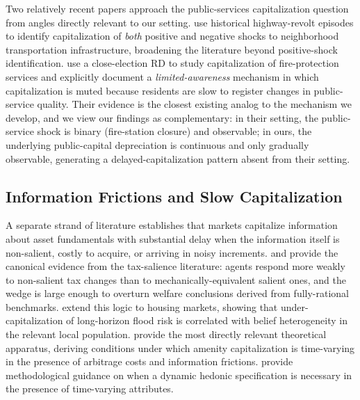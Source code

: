 Two relatively recent papers approach the public-services capitalization question from angles directly relevant to our setting. \citet{brinkman2024freeway} use historical highway-revolt episodes to identify capitalization of {\it both} positive and negative shocks to neighborhood transportation infrastructure, broadening the literature beyond positive-shock identification. \citet{brasington2024fire} use a close-election RD to study capitalization of fire-protection services and explicitly document a {\it limited-awareness} mechanism in which capitalization is muted because residents are slow to register changes in public-service quality. Their evidence is the closest existing analog to the mechanism we develop, and we view our findings as complementary: in their setting, the public-service shock is binary (fire-station closure) and observable; in ours, the underlying public-capital depreciation is continuous and only gradually observable, generating a delayed-capitalization pattern absent from their setting.

\subsection*{Information Frictions and Slow Capitalization}

A separate strand of literature establishes that markets capitalize information about asset fundamentals with substantial delay when the information itself is non-salient, costly to acquire, or arriving in noisy increments. \citet{chetty2009salience} and \citet{finkelstein2009eztax} provide the canonical evidence from the tax-salience literature: agents respond more weakly to non-salient tax changes than to mechanically-equivalent salient ones, and the wedge is large enough to overturn welfare conclusions derived from fully-rational benchmarks. \citet{bakkensen2022underwater} extend this logic to housing markets, showing that under-capitalization of long-horizon flood risk is correlated with belief heterogeneity in the relevant local population. \citet{ouazad2024frictions} provide the most directly relevant theoretical apparatus, deriving conditions under which amenity capitalization is time-varying in the presence of arbitrage costs and information frictions. \citet{bishop2019hedonic} provide methodological guidance on when a dynamic hedonic specification is necessary in the presence of time-varying attributes.

